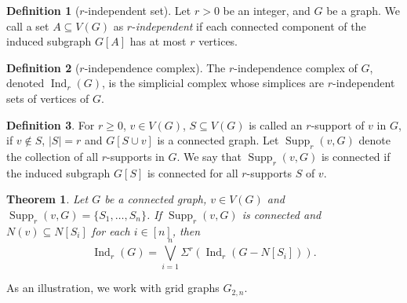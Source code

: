 \documentclass{amsart}
\title{}
\author{}
\newtheorem{theorem}{Theorem}[section]
\theoremstyle{theorem}
\theoremstyle{proposition}
\theoremstyle{remark}
\theoremstyle{definition}
\newtheorem{definition}{Definition}[section]
\theoremstyle{remark}
\theoremstyle{remark}
\begin{document}
\begin{definition}[$r$-independent set]
Let $r>0$ be an integer, and $G$ be a graph. We call a set $A\subseteq V(G)$ as $r$-\emph{independent} if each connected component of the induced subgraph $G[A]$ has at most $r$ vertices. 
\end{definition}
\begin{definition}[$r$-independence complex]
The $r$-independence complex of $G$, denoted $\operatorname{Ind}_r(G)$, is the simplicial complex whose simplices are $r$-independent sets of vertices of $G$.
\end{definition}
\begin{definition}
For $r\geq 0$, $v\in V(G)$, $S\subseteq V(G)$ is called an $r$-support of $v$ in $G$, if $v\not\in S$, $|S|=r$ and $G[S\cup v]$ is a connected graph. Let $\operatorname{Supp}_{r}(v,G)$ denote the collection of all $r$-supports in $G$. We say that $\operatorname{Supp}_r(v,G)$ is connected if the induced subgraph $G[S]$ is connected for all $r$-supports $S$ of $v$.
\end{definition}
\begin{theorem}
Let $G$ be a connected graph, $v\in V(G)$ and $\operatorname{Supp}_r(v,G) = \{S_1,\dots,S_n\}$. If $\operatorname{Supp}_r(v,G)$ is connected and $N(v)\subseteq N[S_i]$ for each $i\in[n]$, then
\begin{equation*}
\operatorname{Ind}_r(G) = \bigvee\limits_{i=1}^{n}\Sigma^r(\operatorname{Ind}_r(G-N[S_i])).
\end{equation*}
\end{theorem}
As an illustration, we work with grid graphs $G_{2,n}$.
\end{document}
